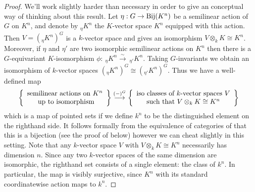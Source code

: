 \documentclass[11pt]{amsart}
\numberwithin{equation}{section}
\theoremstyle{remark}
\theoremstyle{remark}
\theoremstyle{remark}
\theoremstyle{definition}
\theoremstyle{definition}
\theoremstyle{definition}
\theoremstyle{definition}
\theoremstyle{definition}
\theoremstyle{definition}
\begin{document}
\begin{proof}
We'll work slightly harder than necessary in order to give an conceptual way of thinking about this result. %
Let $\eta:G\rightarrow \textup{Bij}(K^n)$ be a semilinear action of $G$ on $K^n$, and denote by $_\eta K^n$ the $K$-vector space $K^n$ equipped with this action. Then $V=(_\eta K^n)^G$ is a $k$-vector space and  gives an isomorphism $V\otimes_k K \cong K^n$. Moreover, if $\eta$ and $\eta'$ are two isomorphic semilinear actions on $K^n$ then there is a $G$-equivariant $K$-isomorphism $\phi:~_\eta K^n \stackrel{\sim}{\longrightarrow} ~_{\eta'} K^n$. Taking $G$-invariants we obtain an isomorphism of $k$-vector spaces $(_\eta K^n)^G\cong (_{\eta'} K^n)^G$. Thus we have a well-defined map 
\[\left\{\begin{array}{c}\textup{semilinear actions on }K^n\\\textup{ up to isomorphism}\end{array}\right\}  \stackrel{(-)^G}{\longrightarrow} \left\{\begin{array}{c}\textup{iso classes of }k\textup{-vector spaces }V\\ \textup{such that }V\otimes_k K \cong K^n\end{array}\right\} \]
which is a map of pointed sets if we define $k^n$ to be the distinguished element on the righthand side.
It follows formally from the equivalence of categories of  that this is a bijection (see the proof of  below) however we can cheat slightly in this setting. Note that any $k$-vector space $V$ with $V\otimes_k K\cong K^n$ necessarily has dimension $n$. Since any two $k$-vector spaces of the same dimension are isomorphic, the righthand set consists of a single element: the class of $k^n$. In particular, the map is visibly surjective, since $K^n$ with its standard coordinatewise action maps to $k^n$. 

\end{proof}
\end{document}
